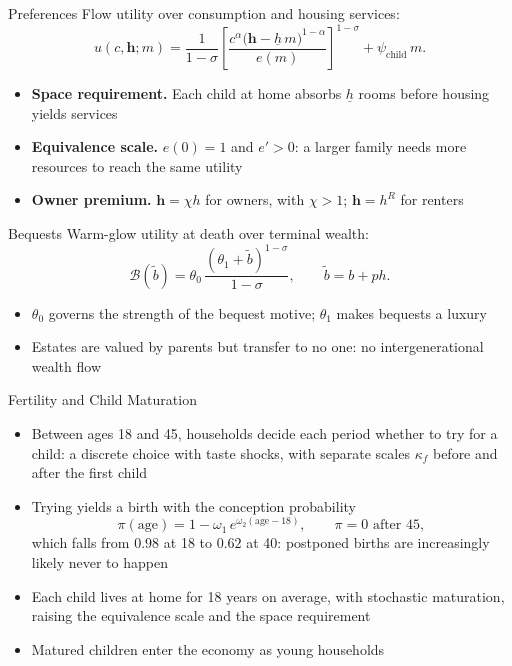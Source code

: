 \documentclass[11pt,aspectratio=169]{beamer}
\begin{document}
\begin{frame}{Preferences}
Flow utility over consumption and housing services:
\[
u(c,\mathbf h;m)
= \frac{1}{1-\sigma}
\left[\frac{c^{\alpha}\big(\mathbf h-\underline h\, m\big)^{1-\alpha}}{e(m)}\right]^{1-\sigma}
+ \psi_{\mathrm{child}}\,m .
\]
\begin{itemize}
  \item \textbf{Space requirement.} Each child at home absorbs $\underline h$ rooms before housing yields services
  \item \textbf{Equivalence scale.} $e(0)=1$ and $e'>0$: a larger family needs more resources to reach the same utility
  \item \textbf{Owner premium.} $\mathbf h = \chi h$ for owners, with $\chi>1$; $\mathbf h = h^R$ for renters
\end{itemize}
\end{frame}

\begin{frame}{Bequests}
Warm-glow utility at death over terminal wealth:
\[
\mathcal B(\widetilde b)
= \theta_0\,\frac{(\theta_1 + \widetilde b)^{1-\sigma}}{1-\sigma},
\qquad
\widetilde b = b + p h .
\]
\begin{itemize}
  \item $\theta_0$ governs the strength of the bequest motive; $\theta_1$ makes bequests a luxury
  \item Estates are valued by parents but transfer to no one: no intergenerational wealth flow
\end{itemize}
\end{frame}

\begin{frame}{Fertility and Child Maturation}
\begin{itemize}
  \item Between ages 18 and 45, households decide each period whether to try for a child: a discrete choice with taste shocks, with separate scales $\kappa_f$ before and after the first child
  \item Trying yields a birth with the conception probability
  \[
  \pi(\mathrm{age}) = 1 - \omega_1\, e^{\omega_2(\mathrm{age}-18)},
  \qquad \pi = 0 \text{ after } 45,
  \]
  which falls from $0.98$ at 18 to $0.62$ at 40: postponed births are increasingly likely never to happen
  \item Each child lives at home for 18 years on average, with stochastic maturation, raising the equivalence scale and the space requirement
  \item Matured children enter the economy as young households
\end{itemize}
\end{frame}
\end{document}
